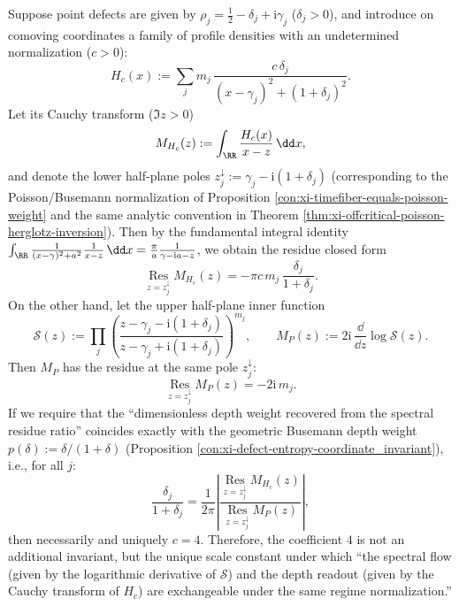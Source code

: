 \begin{proposition}
Suppose point defects are given by \(\rho_j=\tfrac12-\delta_j+\mathrm{i}\gamma_j\) (\(\delta_j>0\)), and introduce on comoving coordinates a family of profile densities with an undetermined normalization (\(c>0\)):
\[
H_{c}(x):=\sum_{j} m_j\,\frac{c\,\delta_j}{(x-\gamma_j)^2+(1+\delta_j)^2}.
\]
Let its Cauchy transform (\(\Im z>0\))
\[
M_{H_c}(z):=\int_{\RR}\frac{H_c(x)}{x-z}\,\dd x,
\]
and denote the lower half-plane poles
\(
z_j^{\downarrow}:=\gamma_j-\mathrm{i}(1+\delta_j)
 \)
(corresponding to the Poisson/Busemann normalization of Proposition \ref{con:xi-timefiber-equals-poisson-weight} and the same analytic convention in Theorem \ref{thm:xi-offcritical-poisson-herglotz-inversion}).
Then by the fundamental integral identity
\(
\int_{\RR}\frac{1}{(x-\gamma)^2+a^2}\frac{1}{x-z}\,\dd x=\frac{\pi}{a}\frac{1}{\gamma-\mathrm{i}a-z}
 \),
we obtain the residue closed form
\[
\operatorname*{Res}_{z=z_j^{\downarrow}}M_{H_c}(z)
=-\pi c\,m_j\,\frac{\delta_j}{1+\delta_j}.
\]
On the other hand, let the upper half-plane inner function
\[
\mathcal{S}(z):=\prod_{j}\left(\frac{z-\gamma_j-\mathrm{i}(1+\delta_j)}{z-\gamma_j+\mathrm{i}(1+\delta_j)}\right)^{m_j},
\qquad
M_{P}(z):=2\mathrm{i}\,\frac{\dd}{\dd z}\log\mathcal{S}(z).
\]
Then \(M_{P}\) has the residue at the same pole \(z_j^{\downarrow}\):
\[
\operatorname*{Res}_{z=z_j^{\downarrow}}M_{P}(z)=-2\mathrm{i}\,m_j.
\]
If we require that the ``dimensionless depth weight recovered from the spectral residue ratio'' coincides exactly with the geometric Busemann depth weight \(p(\delta):=\delta/(1+\delta)\) (Proposition \ref{con:xi-defect-entropy-coordinate_invariant}), i.e., for all \(j\):
\[
\frac{\delta_j}{1+\delta_j}
=\frac{1}{2\pi}\left|\frac{\operatorname*{Res}_{z=z_j^{\downarrow}}M_{H_c}(z)}{\operatorname*{Res}_{z=z_j^{\downarrow}}M_{P}(z)}\right|,
\]
then necessarily and uniquely \(c=4\).
Therefore, the coefficient \(4\) is not an additional invariant, but the unique scale constant under which ``the spectral flow (given by the logarithmic derivative of \(\mathcal{S}\)) and the depth readout (given by the Cauchy transform of \(H_c\)) are exchangeable under the same regime normalization.''
\end{proposition}

